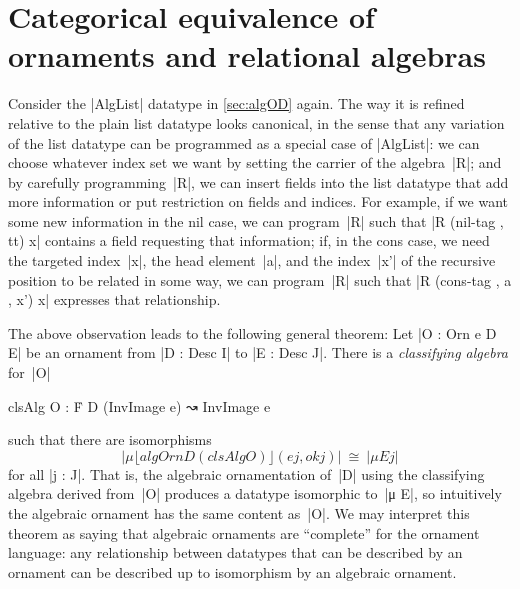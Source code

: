 \chapter{Categorical equivalence of ornaments and relational algebras}
\label{chap:equivalence}

Consider the |AlgList| datatype in \autoref{sec:algOD} again.
The way it is refined relative to the plain list datatype looks canonical, in the sense that any variation of the list datatype can be programmed as a special case of |AlgList|:
we can choose whatever index set we want by setting the carrier of the algebra~|R|; and by carefully programming~|R|, we can insert fields into the list datatype that add more information or put restriction on fields and indices.
For example, if we want some new information in the nil case, we can program~|R| such that |R (nil-tag , tt) x| contains a field requesting that information; if, in the cons case, we need the targeted index~|x|, the head element~|a|, and the index~|x'| of the recursive position to be related in some way, we can program~|R| such that |R (cons-tag , a , x') x| expresses that relationship.

The above observation leads to the following general theorem:
Let |O : Orn e D E| be an ornament from |D : Desc I| to |E : Desc J|.
There is a \emph{classifying algebra} for~|O|
\begin{code}clsAlg O : Ḟ D (InvImage e) ↝ InvImage e
\end{code}such that there are isomorphisms
\[ |μ ⌊ algOrn D (clsAlg O) ⌋ (e j , ok j)| ~\cong~ |μ E j| \]
for all |j : J|.
That is, the algebraic ornamentation of~|D| using the classifying algebra derived from~|O| produces a datatype isomorphic to~|μ E|, so intuitively the algebraic ornament has the same content as~|O|.
We may interpret this theorem as saying that algebraic ornaments are ``complete'' for the ornament language: any relationship between datatypes that can be described by an ornament can be described up to isomorphism by an algebraic ornament.

